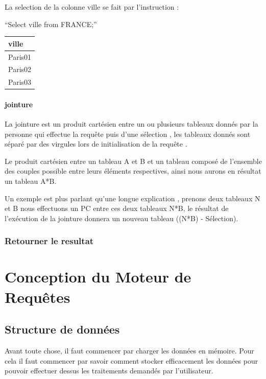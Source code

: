 \documentclass[oneside,13pt,a4paper]{report}
\begin{document}
La selection de la colonne ville se fait par l'instruction :

\enquote{Select ville from FRANCE;}

\begin{tabular}{|l|}
	\hline
	ville
	\\
	\hline
	Paris01 \\
	Paris02 \\
	Paris03 \\
	\hline
\end{tabular}

\subsubsection{jointure}

La jointure est un produit cartésien entre un ou plusieurs tableaux donnés par la personne qui effectue la requête puis d'une sélection , les tableaux donnés sont séparé par des virgules lors de initialisation de la requête .

Le produit cartésien entre un tableau A et B et un tableau composé de l'ensemble des couples possible entre leurs éléments respectives, ainsi nous aurons en résultat un tableau A*B.

Un exemple est plus parlant qu'une longue explication , prenons deux tableaux N et B nous effectuons un PC entre ces deux tableaux N*B, le résultat de l’exécution de la jointure donnera un nouveau tableau ((N*B) - Sélection).

\subsection{Retourner le resultat}



\chapter{Conception du Moteur de Requêtes}

\section{Structure de données}
Avant toute chose, il faut commencer par charger les données en mémoire. Pour cela il faut commencer par savoir comment stocker efficacement les données pour pouvoir effectuer dessus les traitements demandés par l’utilisateur.
\end{document}
